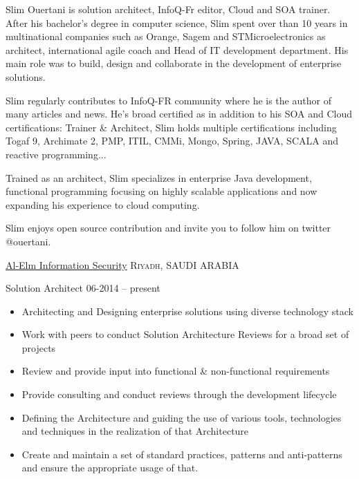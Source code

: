 \documentclass[10pt,a4paper]{article}
\begin{document}
\vspace{-1.3em}  %
\begin{multicols}{2}  %
\hspace{0.5cm} Slim Ouertani is solution architect, InfoQ-Fr editor, Cloud and SOA trainer.
After his bachelor's degree in computer science, Slim spent over than 10 years in multinational companies such as Orange, Sagem and STMicroelectronics as architect, international agile coach and Head of IT development department.
His main role was to build, design and collaborate in the development of enterprise solutions.

\hspace{0.5cm} Slim regularly contributes to InfoQ-FR community where he is the author of many articles and news.
He's broad certified as in addition to his SOA and Cloud certifications: Trainer \& Architect, Slim  holds multiple certifications including Togaf 9, Archimate 2, PMP, ITIL, CMMi, Mongo, Spring, JAVA, SCALA and reactive programming...

\hspace{0.5cm} Trained as an architect, Slim specializes in enterprise Java development, functional programming focusing on highly scalable applications and now expanding his experience to cloud computing.

\hspace{0.5cm} Slim enjoys open source contribution and invite you to follow him on twitter @ouertani.

\end{multicols}


\spacedhrule{0em}{-0.4em}


\headedsection  %
  {\href{http://www.elm.sa/en/Pages/default.aspx}{Al-Elm Information Security}}
  {\textsc{Riyadh, SAUDI ARABIA}} {%
  \headedsubsection
    {Solution Architect}
    {06-2014 -- present}
    {\begin{itemize} \itemsep -2pt  %
 \item Architecting and Designing enterprise solutions using diverse technology stack
 \item Work with peers to conduct Solution Architecture Reviews for a broad set of projects
 \item  Review and provide input into functional \& non-functional requirements
 \item  Provide consulting and conduct reviews through the development lifecycle
 \item  Defining the Architecture and guiding the use of various tools, technologies and techniques in the realization of that Architecture
 \item  Create and maintain a set of standard practices, patterns and anti-patterns and ensure the appropriate usage of that.
 \end{itemize}}
}
\end{document}
